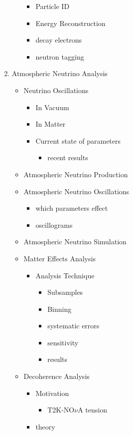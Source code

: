 \documentclass[12pt,oneside,openright]{article}
\begin{document}
\begin{enumerate}
\begin{itemize}
\begin{itemize}
		\item Particle ID
		\item Energy Reconstruction
		\item decay electrons
		\item neutron tagging
		\end{itemize}
	\end{itemize} 
\item Atmospheric Neutrino Analysis
	\begin{itemize}
	\item Neutrino Oscillations
		\begin{itemize}
		\item In Vacuum
		\item In Matter
		\item Current state of parameters
			\begin{itemize}
			\item recent results
			\end{itemize}
		\end{itemize}
	\item Atmospheric Neutrino Production
	\item Atmospheric Neutrino Oscillations
		\begin{itemize}
		\item which parameters effect
		\item oscillograms
		\end{itemize}
	\item Atmospheric Neutrino Simulation
	\item Matter Effects Analysis
		\begin{itemize}
		\item Analysis Technique
			\begin{itemize}
			\item Subsamples
			\item Binning
			\item systematic errors
			\item sensitivity
			\item results
			\end{itemize} 
		\end{itemize}
	\item Decoherence Analysis
		\begin{itemize}
		\item Motivation
			\begin{itemize}
			\item T2K-NO$\nu$A tension
			\end{itemize}
		\item theory

\end{itemize}
\end{itemize}
\end{enumerate}
\end{document}
